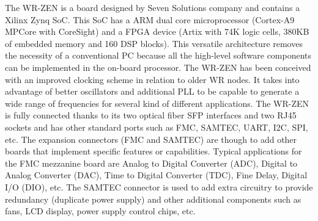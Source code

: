 
The WR-ZEN is a board designed by Seven Solutions company and contains a Xilinx Zynq SoC. This SoC has a ARM dual core microprocessor (Cortex-A9 MPCore with CoreSight) and a FPGA device (Artix with 74K logic cells, 380KB of embedded memory and 160 DSP blocks). This versatile architecture removes the necessity of a conventional PC because all the high-level software components can be implemented in the on-board processor. The WR-ZEN has been conceived with an improved clocking scheme in relation to older WR nodes.  It takes into advantage of better oscillators and additional PLL to be capable to generate a wide range of frequencies for several kind of different applications. The WR-ZEN is fully connected thanks to its two optical fiber SFP interfaces and two RJ45 sockets and has other standard ports such as FMC, SAMTEC, UART, I2C, SPI, etc. The expansion connectors (FMC and SAMTEC) are though to add other boards that implement specific features or capabilities. Typical applications for the FMC mezzanine board are Analog to Digital Converter (ADC), Digital to Analog Converter (DAC), Time to Digital Converter (TDC), Fine Delay, Digital I/O (DIO), etc. The SAMTEC connector is used to add extra circuitry to provide redundancy (duplicate power supply) and other additional components such as fans, LCD display, power supply control chips, etc.

